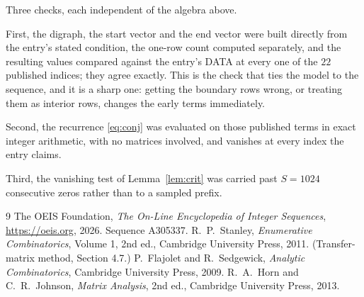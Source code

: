 \documentclass[11pt,a4paper]{article}
\theoremstyle{plain}
\theoremstyle{definition}
\begin{document}
Three checks, each independent of the algebra above.

First, the digraph, the start vector and the end vector were built directly from the
entry's stated condition, the one-row count computed separately, and the resulting values
compared against the entry's DATA at every one of the $22$ published indices; they
agree exactly. This is the check that ties the model to the sequence, and it is a sharp one:
getting the boundary rows wrong, or treating them as interior rows, changes the early terms
immediately.

Second, the recurrence \eqref{eq:conj} was evaluated on those published terms in exact
integer arithmetic, with no matrices involved, and vanishes at every index the entry claims.

Third, the vanishing test of Lemma~\ref{lem:crit} was carried past $S=1024$ consecutive
zeros rather than to a sampled prefix.

\begin{thebibliography}{9}
 The OEIS Foundation, \emph{The On-Line Encyclopedia of Integer
Sequences}, \url{https://oeis.org}, 2026. Sequence A305337.
 R.~P.~Stanley, \emph{Enumerative Combinatorics}, Volume 1, 2nd ed.,
Cambridge University Press, 2011. (Transfer-matrix method, Section 4.7.)
 P.~Flajolet and R.~Sedgewick, \emph{Analytic Combinatorics}, Cambridge
University Press, 2009.
 R.~A.~Horn and C.~R.~Johnson, \emph{Matrix Analysis}, 2nd ed., Cambridge
University Press, 2013.
\end{thebibliography}
\end{document}
